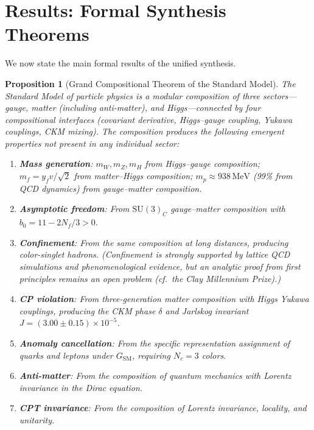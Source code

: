 \documentclass[12pt]{article}
\newtheorem{proposition}[theorem]{Proposition}
\theoremstyle{definition}
\theoremstyle{remark}
\newcommand{\MeV}{\,\mathrm{MeV}}
\newcommand{\su}[1]{\mathrm{SU}(#1)}
\begin{document}
\section{Results: Formal Synthesis Theorems}
\label{sec:results}

We now state the main formal results of the unified synthesis.

\begin{proposition}[Grand Compositional Theorem of the Standard Model]
\label{thm:grand-composition}
The Standard Model of particle physics is a modular composition of three sectors---gauge, matter (including anti-matter), and Higgs---connected by four compositional interfaces (covariant derivative, Higgs--gauge coupling, Yukawa couplings, CKM mixing). The composition produces the following emergent properties not present in any individual sector:
\begin{enumerate}
\item \textbf{Mass generation}: $m_W, m_Z, m_H$ from Higgs--gauge composition; $m_f = y_f v/\sqrt{2}$ from matter--Higgs composition; $m_p \approx 938\MeV$ (99\% from QCD dynamics) from gauge--matter composition.
\item \textbf{Asymptotic freedom}: From $\su{3}_C$ gauge--matter composition with $b_0 = 11 - 2N_f/3 > 0$.
\item \textbf{Confinement}: From the same composition at long distances, producing color-singlet hadrons. (Confinement is strongly supported by lattice QCD simulations and phenomenological evidence, but an analytic proof from first principles remains an open problem (cf.\ the Clay Millennium Prize).)
\item \textbf{CP violation}: From three-generation matter composition with Higgs Yukawa couplings, producing the CKM phase $\delta$ and Jarlskog invariant $J = (3.00 \pm 0.15) \times 10^{-5}$.
\item \textbf{Anomaly cancellation}: From the specific representation assignment of quarks and leptons under $G_{\mathrm{SM}}$, requiring $N_c = 3$ colors.
\item \textbf{Anti-matter}: From the composition of quantum mechanics with Lorentz invariance in the Dirac equation.
\item \textbf{CPT invariance}: From the composition of Lorentz invariance, locality, and unitarity.
\end{enumerate}
\end{proposition}
\end{document}
